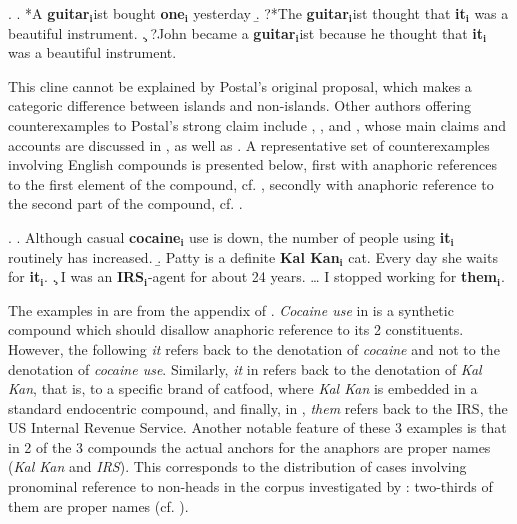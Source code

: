 \ex.
\a. *A \textbf{guitar}$_{\mathbf{i}}$ist bought \textbf{one}$_{\mathbf{i}}$ yesterday
\b. ?*The \textbf{guitar}$_{\mathbf{i}}$ist thought that \textbf{it}$_{\mathbf{i}}$ was a beautiful instrument.
\c. ?John became a \textbf{guitar}$_{\mathbf{i}}$ist because he thought that \textbf{it}$_{\mathbf{i}}$ was a beautiful
instrument.

\enlargethispage{1\baselineskip}
This cline cannot be explained by Postal’s original proposal, which makes a
categoric difference between islands and non-islands. Other authors offering
counterexamples to Postal’s strong claim include \citet{Douloureux:1971}, \citet{Corum:1973}, \citet{Browne:1974} and \citet{Watt:1975}, whose main claims and accounts are
discussed in \citet{Wardetal:1991}, as well as \citet{Levi:1977}. A representative set of
counterexamples involving English compounds is presented below, first with
anaphoric references to the first element of the compound, cf. \Next, secondly with
anaphoric reference to the second part of the compound, cf. \NNext.


\ex. \a. Although casual \textbf{cocaine}$_{\mathbf{i}}$ use is down, the number of people using \textbf{it}$_{\mathbf{i}}$
routinely has increased.
\b. Patty is a definite \textbf{Kal Kan}$_{\mathbf{i}}$ cat. Every day she waits for \textbf{it}$_{\mathbf{i}}$.
\c. I was an \textbf{IRS}$_{\mathbf{i}}$-agent for about 24 years. \dots { }I stopped working for \textbf{them}$_{\mathbf{i}}$.

The examples in \Last are from the appendix of \citet{Wardetal:1991}. \emph{Cocaine use} in \Last[a] is a synthetic compound which should disallow anaphoric reference to its 2
constituents. However, the following \emph{it} refers back to the denotation of \emph{cocaine} and not to the denotation of \emph{cocaine use}. Similarly, \emph{it}
in \Last[b] refers back to the denotation of \emph{Kal Kan}, that is, to a specific brand of
catfood, where \emph{Kal Kan} is embedded in a standard endocentric compound, and
finally, in \Last[c], \emph{them} refers back to the IRS, the US
Internal Revenue Service. Another
notable feature of these 3 examples is that in 2 of the 3
compounds the actual anchors for the anaphors are proper names (\emph{Kal Kan} and \emph{IRS}). 
This corresponds to the
distribution of cases involving pronominal
reference to non-heads in the corpus investigated by
\citet{Wardetal:1991}: two-thirds of them are proper names (cf. \citealt[76]{TenHacken:1994}).
 
